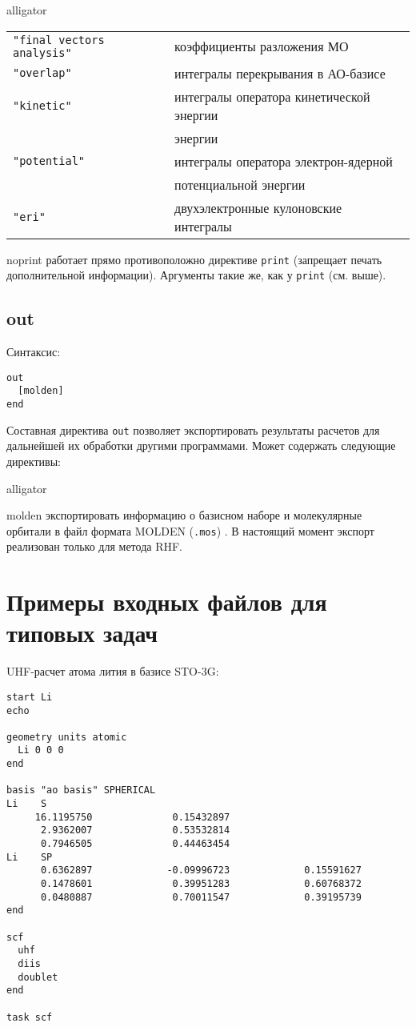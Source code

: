 \documentclass[a4paper, 12pt]{article}
\begin{document}
\begin{labeling}{alligator}
{
\small
\begin{tabular}{|l|l|}
\hline
\texttt{"final vectors analysis"} & коэффициенты разложения МО \\
\texttt{"overlap"}   & интегралы перекрывания в АО-базисе \\
\texttt{"kinetic"}   & интегралы оператора кинетической энергии \\
                     & энергии \\
\texttt{"potential"} & интегралы оператора электрон-ядерной \\
                     & потенциальной энергии \\
\texttt{"eri"}       & двухэлектронные кулоновские интегралы \\
\hline
\end{tabular}
}
\item [noprint] работает прямо противоположно директиве \texttt{print} (запрещает печать дополнительной информации). Аргументы такие же, как у \texttt{print} (см. выше).
\end{labeling}

\subsection{out}

Синтаксис:

\begin{lstlisting}
out
  [molden]
end
\end{lstlisting}

Составная директива \texttt{out} позволяет экспортировать результаты расчетов для дальнейшей их обработки другими программами. Может содержать следующие директивы:

\begin{labeling}{alligator}
\item [molden] экспортировать информацию о базисном наборе и молекулярные орбитали в файл формата MOLDEN (\texttt{.mos}) \cite{molden2000,molden2017,MoldenFormat}. В настоящий момент экспорт реализован только для метода RHF.
\end{labeling}

\section{Примеры входных файлов для типовых задач}\label{sec:examples}

UHF-расчет атома лития в базисе STO-3G:
\begin{lstlisting}
start Li
echo

geometry units atomic
  Li 0 0 0
end

basis "ao basis" SPHERICAL
Li    S
     16.1195750              0.15432897       
      2.9362007              0.53532814       
      0.7946505              0.44463454       
Li    SP
      0.6362897             -0.09996723             0.15591627       
      0.1478601              0.39951283             0.60768372       
      0.0480887              0.70011547             0.39195739       
end

scf
  uhf
  diis
  doublet
end

task scf
\end{lstlisting}
\end{document}
